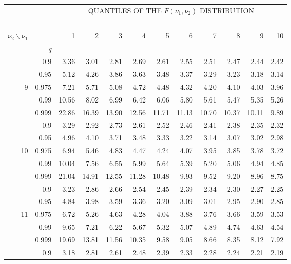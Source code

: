 \documentclass[12pt,a4paper,openany,twoside]{report}
\theoremstyle{definition}
\theoremstyle{remark}
\theoremstyle{plain}
\theoremstyle{definition}
\theoremstyle{definition}
\theoremstyle{definition}
\theoremstyle{remark}
\begin{document}
\newpage

\begin{center}
\begin{tabular}{rr@{\ \ }r@{\ \ }r@{\ \ }r@{\ \ }r@{\ \ }r@{\ \ }r@{\ \ }r@{\ \ }r@{\ \ }r@{\ \ }r@{ }}
& &\multicolumn{10}{c}{QUANTILES OF THE $F(\nu_1, \nu_2)$ DISTRIBUTION}\\
\ \\
$\nu_2\backslash\nu_1$ & & 1 & 2 & 3 & 4 & 5 & 6 & 7 & 8 & 9 & 10\\
 & \textit{q}  &  &  &  &  &  &  &  &  & & \\
\rule{0pt}{2.5ex} & 0.9 & 3.36 & 3.01 & 2.81 & 2.69 & 2.61 & 2.55 & 2.51 & 2.47 & 2.44 & 2.42\\
 & 0.95 & 5.12 & 4.26 & 3.86 & 3.63 & 3.48 & 3.37 & 3.29 & 3.23 & 3.18 & 3.14\\
9 & 0.975 & 7.21 & 5.71 & 5.08 & 4.72 & 4.48 & 4.32 & 4.20 & 4.10 & 4.03 & 3.96\\
 & 0.99 & 10.56 & 8.02 & 6.99 & 6.42 & 6.06 & 5.80 & 5.61 & 5.47 & 5.35 & 5.26\\
 & 0.999 & 22.86 & 16.39 & 13.90 & 12.56 & 11.71 & 11.13 & 10.70 & 10.37 & 10.11 & 9.89\\
\rule{0pt}{2.5ex} & 0.9 & 3.29 & 2.92 & 2.73 & 2.61 & 2.52 & 2.46 & 2.41 & 2.38 & 2.35 & 2.32\\
 & 0.95 & 4.96 & 4.10 & 3.71 & 3.48 & 3.33 & 3.22 & 3.14 & 3.07 & 3.02 & 2.98\\
10 & 0.975 & 6.94 & 5.46 & 4.83 & 4.47 & 4.24 & 4.07 & 3.95 & 3.85 & 3.78 & 3.72\\
 & 0.99 & 10.04 & 7.56 & 6.55 & 5.99 & 5.64 & 5.39 & 5.20 & 5.06 & 4.94 & 4.85\\
 & 0.999 & 21.04 & 14.91 & 12.55 & 11.28 & 10.48 & 9.93 & 9.52 & 9.20 & 8.96 & 8.75\\
\rule{0pt}{2.5ex} & 0.9 & 3.23 & 2.86 & 2.66 & 2.54 & 2.45 & 2.39 & 2.34 & 2.30 & 2.27 & 2.25\\
 & 0.95 & 4.84 & 3.98 & 3.59 & 3.36 & 3.20 & 3.09 & 3.01 & 2.95 & 2.90 & 2.85\\
11 & 0.975 & 6.72 & 5.26 & 4.63 & 4.28 & 4.04 & 3.88 & 3.76 & 3.66 & 3.59 & 3.53\\
 & 0.99 & 9.65 & 7.21 & 6.22 & 5.67 & 5.32 & 5.07 & 4.89 & 4.74 & 4.63 & 4.54\\
 & 0.999 & 19.69 & 13.81 & 11.56 & 10.35 & 9.58 & 9.05 & 8.66 & 8.35 & 8.12 & 7.92\\
\rule{0pt}{2.5ex} & 0.9 & 3.18 & 2.81 & 2.61 & 2.48 & 2.39 & 2.33 & 2.28 & 2.24 & 2.21 & 2.19\\

\end{tabular}
\end{center}
\end{document}
